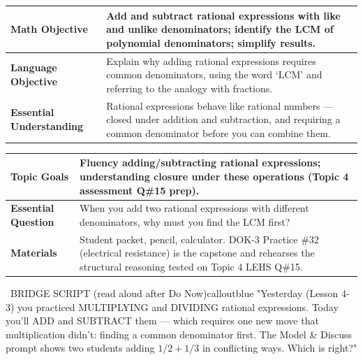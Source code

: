 \documentclass[11pt]{article}
\begin{document}

{\small
\renewcommand{\arraystretch}{1.25}
\noindent\begin{tabular}{|p{1.8in}|p{4.8in}|}
\hline
\textbf{Math Objective} & Add and subtract rational expressions with like and unlike denominators; identify the LCM of polynomial denominators; simplify results. \\ \hline
\textbf{Language Objective} & Explain why adding rational expressions requires common denominators, using the word `LCM' and referring to the analogy with fractions. \\ \hline
\textbf{Essential Understanding} & Rational expressions behave like rational numbers --- closed under addition and subtraction, and requiring a common denominator before you can combine them. \\ \hline
\end{tabular}
}

{\small
\renewcommand{\arraystretch}{1.25}
\noindent\begin{tabular}{|p{1.8in}|p{4.8in}|}
\hline
\textbf{Topic Goals} & Fluency adding/subtracting rational expressions; understanding closure under these operations (Topic 4 assessment Q\#15 prep). \\ \hline
\textbf{Essential Question} & When you add two rational expressions with different denominators, why must you find the LCM first? \\ \hline
\textbf{Materials} & Student packet, pencil, calculator. DOK-3 Practice \#32 (electrical resistance) is the capstone and rehearses the structural reasoning tested on Topic 4 LEHS Q\#15. \\ \hline
\end{tabular}
}


\begin{callout}{\IconMic\ BRIDGE SCRIPT (read aloud after Do Now)}{calloutblue}
"Yesterday (Lesson 4-3) you practiced MULTIPLYING and DIVIDING rational expressions. Today you'll ADD and SUBTRACT them --- which requires one new move that multiplication didn't: finding a common denominator first. The Model \& Discuss prompt shows two students adding \(1/2 + 1/3\) in conflicting ways. Which is right?"
\end{callout}
\end{document}
